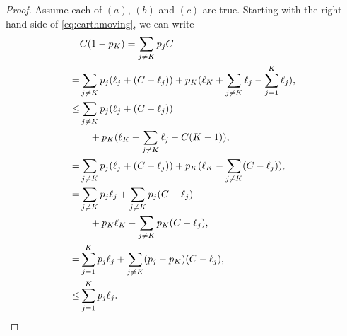\documentclass[letterpaper]{article} %
\begin{document}
\begin{proof}
    Assume each of $(a)$, $(b)$ and $(c)$ are true.
    Starting with the right hand side of \eqref{eq:earthmoving}, we can write
    \begin{align*}
        & C(1-p_K) = \sum_{j\ne K} p_j C
        \\
        = & \sum_{j\ne K} p_j (\ell_j + (C-\ell_j))
        + p_K
        (
            \ell_K + \sum_{j\ne K}\ell_j - \sum_{j=1}^K\ell_j
        ),
        \\
        \leq & \sum_{j\ne K} p_j (\ell_j + (C-\ell_j))
        \\
        &\quad + p_K
        (
            \ell_K + \sum_{j\ne K}\ell_j - C(K-1)
        ),
        \\
        =& \sum_{j\ne K} p_j (\ell_j + (C-\ell_j)) + p_K (\ell_K - \sum_{j\ne K}(C-\ell_j)),
        \\
        =& \sum_{j\ne K} p_j \ell_j + \sum_{j\ne K} p_j(C-\ell_j)
        \\
        &\quad + p_K \ell_K - \sum_{j\ne K}p_K(C-\ell_j),
        \\
        =& \sum_{j=1}^K p_j \ell_j + \sum_{j\ne K} (p_j-p_K)(C-\ell_j),
        \\
        \leq & \sum_{j=1}^K p_j \ell_j. \qedhere
    \end{align*}
\end{proof}
\end{document}

